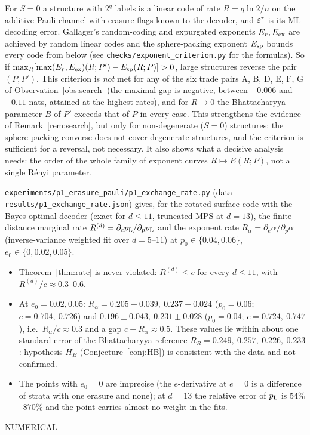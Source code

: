 \begin{remark}\label{rem:exponents}
For $S=0$ a structure with $2^q$ labels is a linear code of rate $R=q\ln2/n$ on the additive Pauli channel with erasure flags known to the decoder, and $\varepsilon^{\star}$ is its ML decoding error. Gallager's random-coding and expurgated exponents $E_r,E_{\rm ex}$ are achieved by random linear codes and the sphere-packing exponent $E_{\rm sp}$ bounds every code from below (see \texttt{checks/exponent\_criterion.py} for the formulas).
So if $\max_R[\max(E_r,E_{\rm ex})(R;P')-E_{\rm sp}(R;P)]>0$, large structures reverse the pair $(P,P')$. This criterion is \emph{not} met for any of the six trade pairs A, B, D, E, F, G of Observation~\ref{obs:search} (the maximal gap is negative, between $-0.006$ and $-0.11$ nats, attained at the highest rates), and for $R\to0$ the Bhattacharyya parameter $B$ of $P'$ exceeds that of $P$ in every case.
This strengthens the evidence of Remark~\ref{rem:search}, but only for non-degenerate ($S=0$) structures: the sphere-packing converse does not cover degenerate structures, and the criterion is sufficient for a reversal, not necessary.
It also shows what a decisive analysis needs: the order of the whole family of exponent curves $R\mapsto E(R;P)$, not a single Rényi parameter.
\end{remark}


\begin{observation}\label{obs:m2}
\texttt{experiments/p1\_erasure\_pauli/p1\_exchange\_rate.py} (data \texttt{results/p1\_exchange\_rate.json}) gives, for the rotated surface code with the Bayes-optimal decoder (exact for $d\le11$, truncated MPS at $d=13$),
the finite-distance marginal rate $R^{(d)}=\partial_ep_{\mathrm{L}}/\partial_pp_{\mathrm{L}}$ and the exponent rate $R_\alpha=\partial_e\alpha/\partial_p\alpha$ (inverse-variance weighted fit over $d=5$--$11$) at $p_0\in\{0.04,0.06\}$, $e_0\in\{0,0.02,0.05\}$.
\begin{itemize}
\item Theorem~\ref{thm:rate} is never violated: $R^{(d)}\le c$ for every $d\le11$, with $R^{(d)}/c\approx0.3$--$0.6$.
\item At $e_0=0.02,0.05$: $R_\alpha=0.205\pm0.039,\ 0.237\pm0.024$ ($p_0=0.06$; $c=0.704,\ 0.726$) and $0.196\pm0.043,\ 0.231\pm0.028$ ($p_0=0.04$; $c=0.724,\ 0.747$), i.e.\ $R_\alpha/c\approx0.3$ and a gap $c-R_\alpha\approx0.5$.
These values lie within about one standard error of the Bhattacharyya reference $R_B=0.249,\ 0.257,\ 0.226,\ 0.233$: hypothesis $H_B$ (Conjecture~\ref{conj:HB}) is consistent with the data and not confirmed.
\item The points with $e_0=0$ are imprecise (the $e$-derivative at $e=0$ is a difference of strata with one erasure and none); at $d=13$ the relative error of $p_{\mathrm{L}}$ is $54\%$--$870\%$ and the point carries almost no weight in the fits.
\end{itemize}
\hfill\st{NUMERICAL}
\end{observation}

